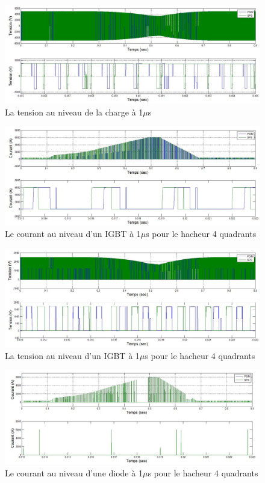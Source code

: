 \documentclass[11pt,letterpaper,final]{report}
\begin{document}
\begin{figure}[htb]
\centering
\includegraphics[scale=0.5]{Fig/DCP_AFE/1u/ten_ch.jpg}
\caption{La tension au niveau de la charge à 1$\mu$s}
\label{AF_DC_CHV1}
\end{figure}

\begin{figure}[htb]
\centering
\includegraphics[scale=0.5]{Fig/DCP_AFE/1u/hash_cou_IGBT.jpg}
\caption{Le courant au niveau d'un IGBT à 1$\mu$s pour le hacheur 4 quadrants}
\label{AF_DC_HAA1}
\end{figure}

\begin{figure}[htb]
\centering
\includegraphics[scale=0.5]{Fig/DCP_AFE/1u/hash_ten_IGBT.jpg}
\caption{La tension au niveau d'un IGBT à 1$\mu$s pour le hacheur 4 quadrants}
\label{AF_DC_HAV1}
\end{figure}


\begin{figure}[htb]
\centering
\includegraphics[scale=0.5]{Fig/DCP_AFE/1u/hash_diode_cou.jpg}
\caption{Le courant au niveau d'une diode à 1$\mu$s pour le hacheur 4 quadrants}
\label{AF_DC_HA1}
\end{figure}
\end{document}
